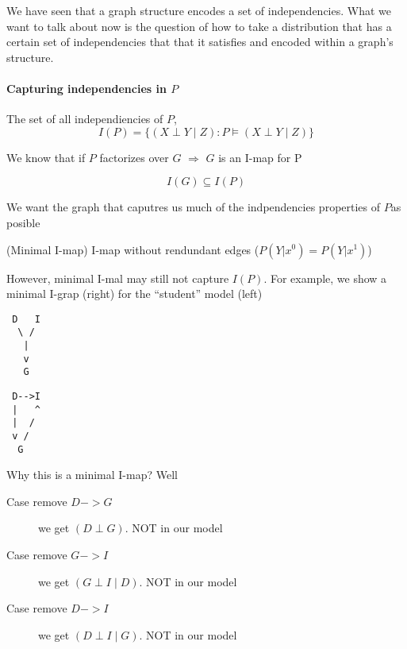 
We have seen that a graph structure encodes a set of independencies.
What we want to talk about now is the question of how to take a distribution
that has a certain set of independencies that that it satisfies and encoded within a graph's structure.

\paragraph{Capturing independencies in $P$}

The set of all independiencies of $P$, 
\begin{equation}
 I(P) = \{(X \perp Y \mid Z) : P \models (X \perp Y \mid Z) \}
\end{equation}

We know that if $P$ factorizes over $G$ $\Rightarrow$ $G$ is an I-map for P

\begin{equation}
I(G) \subseteq  I(P)
\end{equation}

\begin{framed} \centering
 We want the graph that caputres us much of the indpendencies properties of $P$as posible
\end{framed}

\begin{definition}(Minimal I-map)
 I-map without rendundant edges ($P(Y|x^0) = P(Y|x^1)$)
\end{definition}

However, minimal I-mal may still not capture $I(P)$. For example, we show a minimal I-grap (right) for the ``student'' model (left) 
\begin{paracol}{2}
\begin{verbatim}
 D   I 
  \ /
   |
   v
   G
\end{verbatim}
 \switchcolumn
\begin{verbatim}
 D-->I 
 |   ^
 |  /
 v /
  G
\end{verbatim} 

\end{paracol}

Why this is a minimal I-map? Well
\begin{description}
 \item[Case remove $D->G$] we get $(D \perp G)$. NOT in our model 
 \item[Case remove $G->I$] we get $(G \perp I \mid D)$. NOT in our model
 \item[Case remove $D->I$] we get $(D \perp I \mid G)$. NOT in our model
\end{description}

